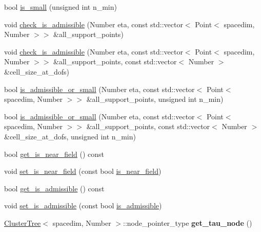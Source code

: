 \begin{DoxyCompactItemize}
\item 
bool \hyperlink{classBlockCluster_adb6edc09ec2c579677e0532644b9f57d}{is\+\_\+small} (unsigned int n\+\_\+min)
\item 
void \hyperlink{classBlockCluster_a1f56a4b4d2c24fe8e78a954e13134ee1}{check\+\_\+is\+\_\+admissible} (Number eta, const std\+::vector$<$ Point$<$ spacedim, Number $>$$>$ \&all\+\_\+support\+\_\+points)
\item 
void \hyperlink{classBlockCluster_a79e83ccbdb52032b6b2d83e7d095e62d}{check\+\_\+is\+\_\+admissible} (Number eta, const std\+::vector$<$ Point$<$ spacedim, Number $>$$>$ \&all\+\_\+support\+\_\+points, const std\+::vector$<$ Number $>$ \&cell\+\_\+size\+\_\+at\+\_\+dofs)
\item 
bool \hyperlink{classBlockCluster_a3d1d12357cac0ff4df90fd576c5f2aa0}{is\+\_\+admissible\+\_\+or\+\_\+small} (Number eta, const std\+::vector$<$ Point$<$ spacedim, Number $>$$>$ \&all\+\_\+support\+\_\+points, unsigned int n\+\_\+min)
\item 
bool \hyperlink{classBlockCluster_a620554d7d66beaf4dc38f166bc6dceed}{is\+\_\+admissible\+\_\+or\+\_\+small} (Number eta, const std\+::vector$<$ Point$<$ spacedim, Number $>$$>$ \&all\+\_\+support\+\_\+points, const std\+::vector$<$ Number $>$ \&cell\+\_\+size\+\_\+at\+\_\+dofs, unsigned int n\+\_\+min)
\item 
bool \hyperlink{classBlockCluster_ac263721e28921a6177a025139745fe8d}{get\+\_\+is\+\_\+near\+\_\+field} () const
\item 
void \hyperlink{classBlockCluster_a89063f39db2c5868abb54650108623dc}{set\+\_\+is\+\_\+near\+\_\+field} (const bool \hyperlink{classBlockCluster_a6f719cbd6a646328f8128355c857745a}{is\+\_\+near\+\_\+field})
\item 
bool \hyperlink{classBlockCluster_a792554d843db2dfb996a1d1086e9178b}{get\+\_\+is\+\_\+admissible} () const
\item 
void \hyperlink{classBlockCluster_a598050ab9a4340c3cd02f678788f5bb0}{set\+\_\+is\+\_\+admissible} (const bool \hyperlink{classBlockCluster_ae85d165894d10b7e58fbe20edd506abe}{is\+\_\+admissible})
\item 
\mbox{\label{classBlockCluster_a115554141628dd4d4c43000a17d0de87}} 
\hyperlink{classClusterTree}{Cluster\+Tree}$<$ spacedim, Number $>$\+::node\+\_\+pointer\+\_\+type {\bfseries get\+\_\+tau\+\_\+node} ()
\item 
\mbox{\label{classBlockCluster_a0eee0e86e3f4efaace6ca1e1ae799b5e}} 

\end{DoxyCompactItemize}
